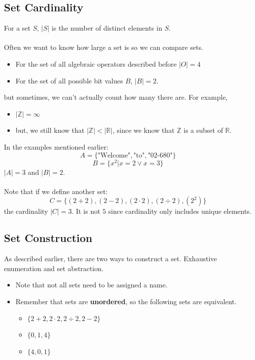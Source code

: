 \documentclass[10pt]{article}
\begin{document}
\subsection*{Set Cardinality}
For a set $S$, $|S|$ is the number of distinct elements in $S$.\\\\
Often we want to know how large a set is so we can compare sets.
\begin{itemize}
	\item For the set of all algebraic operators described before $|O| = 4$
	\item For the set of all possible bit values $B$, $|B| = 2$.
\end{itemize}
but sometimes, we can't actually count how many there are.  For example,
\begin{itemize}
	\item $|\mathbb{Z}| = \infty$
	\item but, we still know that $|\mathbb{Z}| < |\mathbb{R}|$, since we know that $\mathbb{Z}$ is a subset of $\mathbb{R}$.
\end{itemize}
In the examples mentioned earlier:
\[A = \{\text{"Welcome"}, \text{"to"}, \text{"02-680"}\}\]
\[B = \{x^2 | x = 2 \lor x = 3\}\]
$|A| = 3$ and $|B| = 2$.\\\\
Note that if we define another set:
\[C = \{(2 + 2), (2 - 2), (2 \cdot 2), (2 \div 2), (2^2)\}\]
the cardinality $|C| = 3$.  It is not $5$ since cardinality only includes unique elements.

\subsection*{Set Construction}
As described earlier, there are two ways to construct a set.  Exhaustive enumeration and set abstraction.
\begin{itemize}
	\item Note that not all sets need to be assigned a name.
	\item Remember that sets are \textbf{unordered}, so the following sets are equivalent.
	\begin{itemize}
	    \item $\{2 + 2, 2 \cdot 2, 2 \div 2, 2 - 2\}$
	    \item $\{0, 1, 4\}$
	    \item $\{4, 0, 1\}$
    \end{itemize}
\end{itemize}
\end{document}
